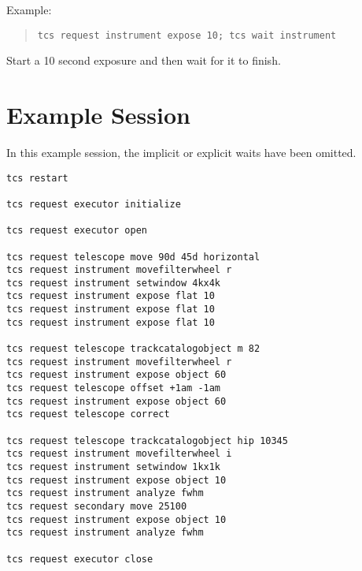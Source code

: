 Example:

\begin{quote}
\verb|tcs request instrument expose 10; tcs wait instrument|
\end{quote}
Start a 10 second exposure and then wait for it to finish.

\section{Example Session}

In this example session, the implicit or explicit waits have been omitted.

\begin{verbatim}
tcs restart

tcs request executor initialize

tcs request executor open

tcs request telescope move 90d 45d horizontal
tcs request instrument movefilterwheel r
tcs request instrument setwindow 4kx4k
tcs request instrument expose flat 10
tcs request instrument expose flat 10
tcs request instrument expose flat 10

tcs request telescope trackcatalogobject m 82
tcs request instrument movefilterwheel r
tcs request instrument expose object 60
tcs request telescope offset +1am -1am
tcs request instrument expose object 60
tcs request telescope correct

tcs request telescope trackcatalogobject hip 10345
tcs request instrument movefilterwheel i
tcs request instrument setwindow 1kx1k
tcs request instrument expose object 10
tcs request instrument analyze fwhm
tcs request secondary move 25100
tcs request instrument expose object 10
tcs request instrument analyze fwhm

tcs request executor close
\end{verbatim}




